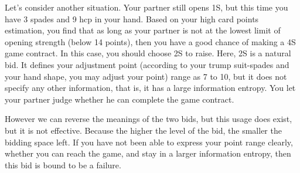 \documentclass[11pt]{article}
\begin{document}
Let’s consider another situation. Your partner still opens 1S, but this time you have 3 spades and 9 hcp in your hand. Based on your high card points estimation, you find that as long as your partner is not at the lowest limit of opening strength (below 14 points), then you have a good chance of making a 4S game contract. In this case, you should choose 2S to raise. Here, 2S is a natural bid. It defines your adjustment point (according to your trump suit-spades and your hand shape, you may adjust your point) range as 7 to 10, but it does not specify any other information, that is, it has a large information entropy. You let your partner judge whether he can complete the game contract.

However we can reverse the meanings of the two bids, but this usage does exist, but it is not effective. Because the higher the level of the bid, the smaller the bidding space left. If you have not been able to express your point range clearly, whether you can reach the game, and stay in a larger information entropy, then this bid is bound to be a failure.
\end{document}

